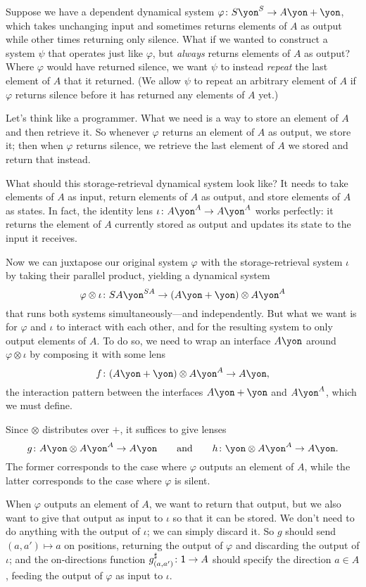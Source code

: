 \documentclass[Book-Poly]{subfiles}
\begin{document}
\begin{example}[Repeater]
Suppose we have a dependent dynamical system $\varphi\colon S\yon^S\to A\yon+\yon$, which takes unchanging input and sometimes returns elements of $A$ as output while other times returning only silence.
What if we wanted to construct a system $\psi$ that operates just like $\varphi$, but \emph{always} returns elements of $A$ as output?
Where $\varphi$ would have returned silence, we want $\psi$ to instead \emph{repeat} the last element of $A$ that it returned. (We allow $\psi$ to repeat an arbitrary element of $A$ if $\varphi$ returns silence before it has returned any elements of $A$ yet.)

Let's think like a programmer.
What we need is a way to store an element of $A$ and then retrieve it.
So whenever $\varphi$ returns an element of $A$ as output, we store it; then when $\varphi$ returns silence, we retrieve the last element of $A$ we stored and return that instead.

What should this storage-retrieval dynamical system look like?
It needs to take elements of $A$ as input, return elements of $A$ as output, and store elements of $A$ as states.
In fact, the identity lens $\iota\colon A\yon^A\to A\yon^A$ works perfectly: it returns the element of $A$ currently stored as output and updates its state to the input it receives.

Now we can juxtapose our original system $\varphi$ with the storage-retrieval system $\iota$ by taking their parallel product, yielding a dynamical system
\[
    \varphi\otimes\iota\colon SA\yon^{SA}\to (A\yon+\yon)\otimes A\yon^A
\]
that runs both systems simultaneously---and independently.
But what we want is for $\varphi$ and $\iota$ to interact with each other, and for the resulting system to only output elements of $A$.
To do so, we need to wrap an interface $A\yon$ around $\varphi\otimes\iota$ by composing it with some lens
\[
    f\colon(A\yon+\yon)\otimes A\yon^A\to A\yon,
\]
the interaction pattern between the interfaces $A\yon+\yon$ and $A\yon^A$, which we must define.

Since $\otimes$ distributes over $+$, it suffices to give lenses
\[
    g\colon A\yon\otimes A\yon^A\to A\yon \qqand h\colon\yon\otimes A\yon^A\to A\yon.
\]
The former corresponds to the case where $\varphi$ outputs an element of $A$, while the latter corresponds to the case where $\varphi$ is silent.

When $\varphi$ outputs an element of $A$, we want to return that output, but we also want to give that output as input to $\iota$ so that it can be stored.
We don't need to do anything with the output of $\iota$; we can simply discard it.
So $g$ should send $(a,a')\mapsto a$ on positions, returning the output of $\varphi$ and discarding the output of $\iota$; and the on-directions function $g^\sharp_{(a,a')}\colon\textsf{1}\to A$ should specify the direction $a\in A$, feeding the output of $\varphi$ as input to $\iota$.


\end{example}
\end{document}
